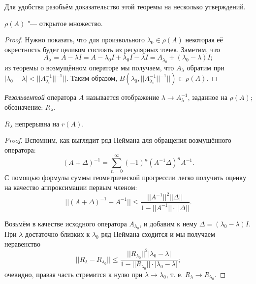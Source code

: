 \documentclass[main]{subfiles}
\begin{document}
Для удобства разобьём доказательство
этой теоремы на несколько утверждений.


\setcounter{proposition}{-1}
\begin{proposition} %
  \( \rho(A) \) "--- открытое множество.
\end{proposition}
\begin{proof}
  Нужно показать, что для произвольного
  \( \lambda_0 \in \rho(A) \) некоторая её
  окрестность будет целиком состоять
  из регулярных точек.
  Заметим, что
  \[
    A_\lambda = A - \lambda I =
    A - \lambda_0 I + \lambda_0 I - \lambda I =
    A_{\lambda_0} + (\lambda_0 - \lambda) I;
  \]
  из теоремы о возмущённом операторе мы получаем,
  что \( A_\lambda \) обратим при
  \( |\lambda_0 - \lambda| < ||A_{\lambda_0}^{-1}||^{-1}|| \).
  Таким образом,
  \( B(\lambda_0, ||A_{\lambda_0}^{-1}||^{-1}||) \subset \rho(A) \).
\end{proof}

%

\begin{definition}
  \emph{Резольвентой} оператора \( A \) называется
  отображение \( \lambda \to A_\lambda^{-1} \),
  заданное на \( \rho(A) \); обозначение: \( R_\lambda \).
\end{definition}

\begin{proposition} %
  \( R_\lambda \) непрерывна на \( r(A) \).
\end{proposition}
\begin{proof}
  Вспомним, как выглядит ряд Неймана
  для обращения возмущённого оператора:
  \[
    (A + \Delta)^{-1} = \sum_{n=0}^\infty (-1)^n (A^{-1} \Delta)^n A^{-1}.
  \]
  С помощью формулы суммы геометрической прогрессии
  легко получить оценку на качество аппроксимации первым членом:
  \[
    ||(A + \Delta)^{-1} - A^{-1}|| \le \frac{||A^{-1}||^2 ||\Delta||}
    {1 - ||A^{-1}|| \cdot ||\Delta||}.
  \]

  Возьмём в качестве исходного оператора \( A_{\lambda_0} \),
  и добавим к нему \( \Delta = (\lambda_0 - \lambda) I \).
  При \( \lambda \) достаточно близких к \( \lambda_0 \)
  ряд Неймана сходится и мы получаем неравенство
  \[
    ||R_\lambda - R_{\lambda_0}|| \le
    \frac{||R_{\lambda_0}||^2 |\lambda_0 - \lambda|}
    {1 - ||R_{\lambda_0}|| \cdot |\lambda_0 - \lambda|};
  \]
  очевидно, правая часть стремится к нулю при
  \( \lambda \to \lambda_0 \), т. е.
  \( R_\lambda \to R_{\lambda_0} \).
\end{proof}
\end{document}
